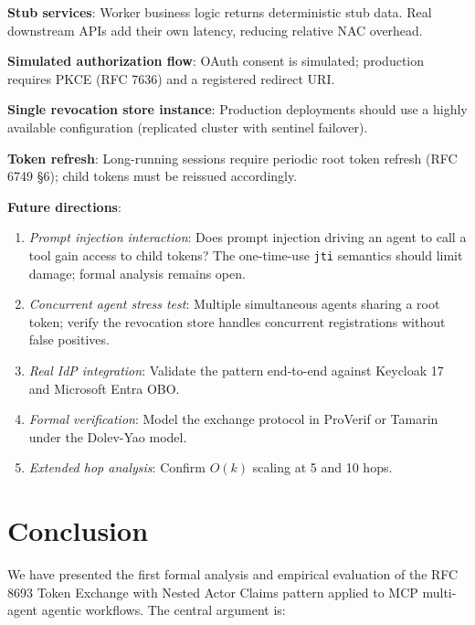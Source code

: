 \documentclass[journal]{IEEEtran}
\begin{document}
\textbf{Stub services}: Worker business logic returns deterministic stub data.
Real downstream APIs add their own latency, reducing relative NAC overhead.

\textbf{Simulated authorization flow}: OAuth consent is simulated; production
requires PKCE (RFC 7636) and a registered redirect URI.

\textbf{Single revocation store instance}: Production deployments should use a
highly available configuration (replicated cluster with sentinel failover).

\textbf{Token refresh}: Long-running sessions require periodic root token refresh
(RFC 6749 §6); child tokens must be reissued accordingly.

\textbf{Future directions}:
\begin{enumerate}
  \item \textit{Prompt injection interaction}: Does prompt injection driving an
        agent to call a tool gain access to child tokens? The one-time-use
        \texttt{jti} semantics should limit damage; formal analysis remains open.
  \item \textit{Concurrent agent stress test}: Multiple simultaneous agents
        sharing a root token; verify the revocation store handles concurrent
        registrations without false positives.
  \item \textit{Real IdP integration}: Validate the pattern end-to-end against
        Keycloak 17 and Microsoft Entra OBO.
  \item \textit{Formal verification}: Model the exchange protocol in ProVerif
        \cite{blanchet2001} or Tamarin \cite{meier2013} under the Dolev-Yao
        model.
  \item \textit{Extended hop analysis}: Confirm $O(k)$ scaling at 5 and 10
        hops.
\end{enumerate}


\section{Conclusion}
\label{sec:conclusion}

We have presented the first formal analysis and empirical evaluation of the
RFC 8693 Token Exchange with Nested Actor Claims pattern applied to MCP
multi-agent agentic workflows. The central argument is:
\end{document}
